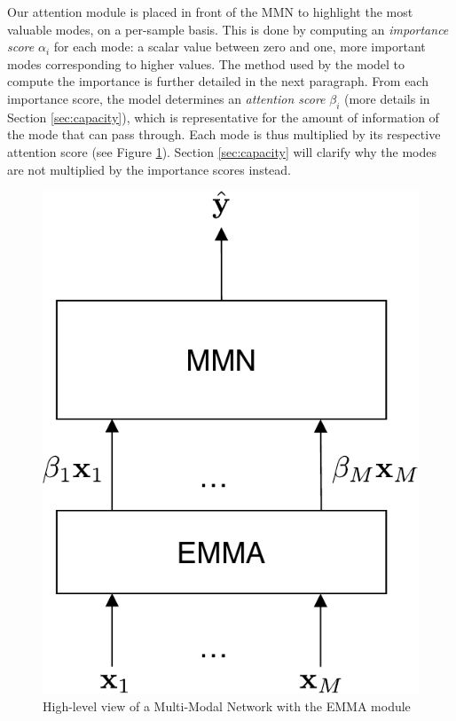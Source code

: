 Our attention module is placed in front of the MMN to highlight the most valuable modes, on a per-sample basis. This is done by computing an \textit{importance score} $\alpha_i$ for each mode: a scalar value between zero and one, more important modes corresponding to higher values. The method used by the model to compute the importance is further detailed in the next paragraph. From each importance score, the model determines an \textit{attention score} $\beta_i$ (more details in Section \ref{sec:capacity}), which is representative for the amount of information of the mode that can pass through. Each mode is thus multiplied by its respective attention score (see Figure \ref{fig:mnn-with-emma}). Section \ref{sec:capacity} will clarify why the modes are not multiplied by the importance scores instead. 
\begin{figure}[!h]
\centering
\includegraphics[scale=0.5]{figures/mlp-with-emma}
\caption[High-level view of a Multi-Modal Network with EMMA]{High-level view of a Multi-Modal Network with the EMMA module}	
\label{fig:mnn-with-emma}
\end{figure}


